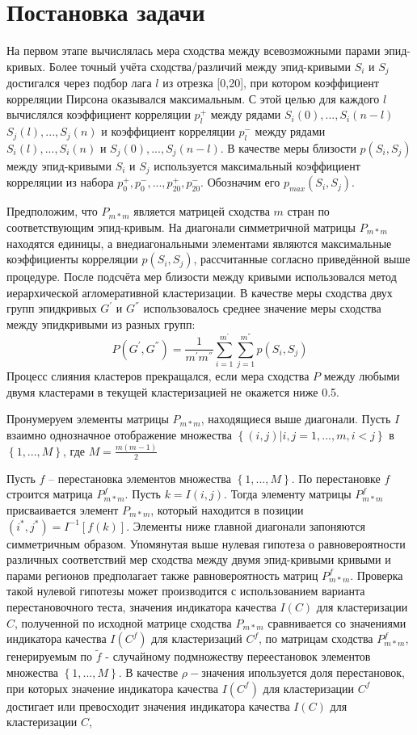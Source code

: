 \documentclass{article}
\begin{document}
\section{Постановка задачи}
На первом этапе вычислялась мера сходства между всевозможными парами эпид-кривых. Более точный учёта сходства/различий между
эпид-кривыми $S_i$ и $S_j$ достигался через подбор лага $l$ из отрезка [0,20], при котором коэффициент корреляции Пирсона оказывался максимальным. С этой целью для каждого $l$ вычислялся коэффициент корреляции $p^+_l$
между рядами $S_i (0), . . . , S_i (n - l)$  $S_j (l), . . . , S_j (n)$ и коэффициент корреляции $p^{-}_{l}$ между рядами $S_i (l), . . . , S_i (n)$ и $S_j (0), . . . , S_j (n - l)$. В качестве меры близости $p(S_i, S_j)$ между эпид-кривыми $S_i$ и $S_j$ используется максимальный коэффициент корреляции из набора $p^+_0, p^-_0, ..., p^+_{20}, p^-_{20}$. Обозначим его $p_{max}(S_i, S_j)$.

Предположим, что $P_{m*m}$ является матрицей сходства $m$ стран по соответствующим эпид-кривым. На диагонали симметричной матрицы $P_{m*m}$ находятся единицы, а внедиагональными элементами являются максимальные коэффициенты корреляции $p(S_i, S_j )$, рассчитанные согласно приведённой выше процедуре. После подсчёта мер близости между кривыми использовался метод иерархической агломеративной кластеризации. В качестве меры сходства двух групп эпидкривых $G^{'}$ и $G^{''}$ использовалось среднее значение меры сходства между эпидкривыми из разных групп:
$$P(G^{'}, G^{''}) = \frac{1}{m^{'}m^{''}}\sum_{i=1}^{m^{'}}\sum_{j=1}^{m^{''}}p(S_i, S_j) $$
Процесс слияния кластеров прекращался, если мера сходства $P$ между любыми двумя кластерами в текущей кластеризацией не окажется ниже 0.5.

Пронумеруем элементы матрицы $P_{m*m}$, находящиеся выше диагонали. Пусть $I$ взаимно однозначное отображение множества $\left\{{(i, j)| i, j = 1, . . . , m, i < j}\right\}$ в $\left\{1, . . . , M\right\}$, где $M = \frac{m(m-1)}{2}$

Пусть $f$ – перестановка элементов множества $\left\{{1, . . . , M} \right\}$. По перестановке $f$ строится матрица $P_{m*m}^f$. Пусть $k = I(i, j)$. Тогда элементу матрицы $P_{m*m}^f$ присваивается элемент $P_{m*m}$, который находится в позиции $(i^*, j^*) = I^
{−1}[f(k)]$. Элементы ниже главной диагонали запоняются симметричным образом. Упомянутая выше нулевая гипотеза о равновероятности различных соответствий мер сходства между двумя эпид-кривыми кривыми и парами регионов предполагает также равновероятность матриц $P_{m*m}^f$. Проверка такой нулевой гипотезы может производится с использованием варианта перестановочного теста, значения индикатора качества $I(C)$ для кластеризации $C$, полученной по исходной матрице сходства $P_{m*m}$ сравнивается со значениями индикатора качества $I(C^f)$
для кластеризаций $C^f$, по матрицам сходства $P_{m*m}^f$, генерируемым по $\widetilde {f}$ - случайному подмножеству переестановок элементов множества $\left\{{1, . . . , M} \right\}$. В качестве $\rho-$значения ипользуется доля перестановок, при которых значение индикатора качества $I(C^f)$ для кластеризации $C^f$ достигает или превосходит значения индикатора качества $I(C)$ для кластеризации $C$,
\end{document}
